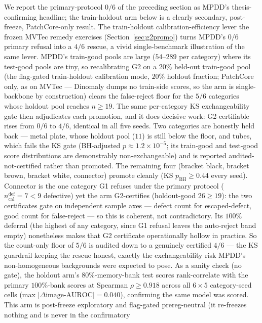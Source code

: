 \documentclass[11pt]{article}
\begin{document}
We report the primary-protocol $0/6$ of the preceding section as MPDD's thesis-confirming
headline; the train-holdout arm below is a clearly secondary, post-freeze, PatchCore-only result.
The train-holdout calibration-efficiency lever the frozen MVTec remedy exercises
(Section~\ref{sec:g2promo}) turns MPDD's $0/6$ primary refusal into a $4/6$ rescue, a vivid
single-benchmark illustration of the same lever. MPDD's train-good pools are large ($54$--$289$ per category) where its
test-good pools are tiny, so recalibrating G2 on a $20\%$ held-out train-good pool (the flag-gated
train-holdout calibration mode, $20\%$ holdout fraction; PatchCore only, as on
MVTec --- Dinomaly dumps no train-side scores, so the arm is single-backbone by construction)
clears the false-reject floor for the $5/6$ categories whose holdout pool reaches $n\ge 19$. The
same per-category KS exchangeability gate then adjudicates each promotion, and it does decisive
work: G2-certifiable rises from $0/6$ to $4/6$, identical in all five seeds. Two
categories are honestly held back --- metal plate, whose holdout pool ($11$) is still
below the floor, and tubes, which fails the KS gate (BH-adjusted $p\approx
1.2\times10^{-5}$; its train-good and test-good score distributions are demonstrably
non-exchangeable) and is reported audited-not-certified rather than promoted. The remaining four
(bracket black, bracket brown, bracket white, connector)
promote cleanly (KS $p_{\text{BH}}\ge 0.44$ every seed). Connector is the one category
G1 refuses under the primary protocol ($n_{\text{cal}}^{\text{def}}=7<9$ defective) yet
the arm G2-certifies (holdout-good $26\ge 19$): the two certificates gate on independent sample
axes --- defect count for escaped-defect, good count for false-reject --- so this is coherent, not
contradictory. Its $100\%$ deferral (the highest of any category, since G1 refusal leaves the
auto-reject band empty) nonetheless makes that G2 certificate operationally hollow in practice.
So the count-only floor of $5/6$ is
audited down to a genuinely certified $4/6$ --- the KS guardrail keeping the rescue honest, exactly
the exchangeability risk MPDD's non-homogeneous backgrounds were expected to pose. As a sanity
check (no gate), the holdout arm's $80\%$-memory-bank test scores rank-correlate with the primary
$100\%$-bank scores at Spearman $\rho\ge 0.918$ across all $6\times5$ category-seed cells (max
$|\Delta\text{image-AUROC}|=0.040$), confirming the same model was scored. This arm is post-freeze
exploratory and flag-gated prereg-neutral (it re-freezes nothing and is never in the confirmatory
\end{document}
